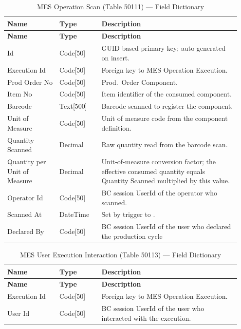 \begin{longtable}{@{} P{0.21\linewidth} P{0.17\linewidth} P{0.57\linewidth} @{}}
	\caption{MES Operation Scan (Table 50111) --- Field Dictionary}
	\label{tab:s3-table-consumption} \\
	\toprule
	\textbf{Name} & \textbf{Type} & \textbf{Description} \\
	\midrule
	\endfirsthead
	\toprule
	\textbf{Name} & \textbf{Type} & \textbf{Description} \\
	\midrule
	\endhead
	
	\endlastfoot
	
	Id & Code[50] & GUID-based primary key; auto-generated on insert. \\
	\midrule
	Execution Id & Code[50] & Foreign key to MES Operation Execution. \\
	\midrule
	Prod Order No & Code[50] & Prod.\ Order Component. \\
	\midrule
	Item No & Code[50] & Item identifier of the consumed component. \\
	\midrule
	Barcode & Text[500] & Barcode scanned to register the component. \\
	\midrule
	Unit of Measure & Code[50] & Unit of measure code from the component definition. \\
	\midrule
	Quantity Scanned & Decimal & Raw quantity read from the barcode scan. \\
	\midrule
	Quantity per Unit of Measure & Decimal & Unit-of-measure conversion factor; the effective consumed quantity equals Quantity Scanned multiplied by this value. \\	
	\midrule
	Operator Id & Code[50] & BC session UserId of the operator who scanned. \\
	\midrule
	Scanned At & DateTime & Set by  trigger to . \\
	\midrule
	Declared By & Code[50] &  BC session UserId of the user who declared the production cycle  \\
	\midrule
\end{longtable}


\begin{longtable}{@{} P{0.21\linewidth} P{0.17\linewidth} P{0.57\linewidth} @{}}
	\caption{MES User Execution Interaction (Table 50113) --- Field Dictionary}
	\label{tab:s3-table-consumption} \\
	\toprule
	\textbf{Name} & \textbf{Type} & \textbf{Description} \\
	\midrule
	\endfirsthead
	\toprule
	\textbf{Name} & \textbf{Type} & \textbf{Description} \\
	\midrule
	\endhead

	\endlastfoot
	
	Execution Id & Code[50] & Foreign key to MES Operation Execution. \\
	\midrule
	User Id & Code[50] & BC session UserId of the user who interacted with the execution. \\
	\midrule
\end{longtable}

